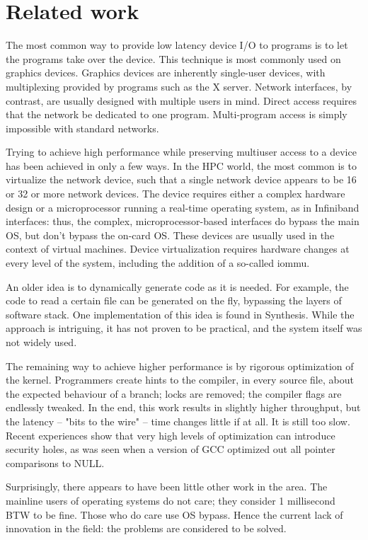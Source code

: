 \documentclass[letterpaper,twocolumn,10pt]{article}
\begin{document}
\section{Related work}
The most common way to provide low latency device I/O 
to programs is to let the programs take over the device. 
This technique is most commonly used on graphics devices. Graphics devices are inherently single-user devices, with multiplexing 
provided by programs such as the X server. Network interfaces, by contrast, are usually designed with multiple users in mind. 
Direct access requires that the network be dedicated to one program. Multi-program access is simply impossible with 
standard networks. 

Trying to achieve high performance while preserving multiuser access to a device 
has been achieved in only a few ways. In the HPC world, 
the most common is to virtualize the network device, such 
that a single network device appears to be 16 or 32 or more network devices. The device 
requires either a complex hardware design or a microprocessor running a real-time operating system, as in 
Infiniband interfaces: thus, the complex, microprocessor-based interfaces do bypass the main OS, 
but don't bypass the on-card OS\cite{Boden95myrinet}. 
These devices are usually 
used in the context of virtual machines. Device virtualization  requires hardware changes at every level of the system, including
the addition of a so-called iommu\cite{iommu}. 

An older idea is to dynamically generate code as it is needed. For example, the code to read a certain file can 
be generated on the fly, bypassing the layers of software stack. One implementation of this idea 
is found in   Synthesis\cite{synthesis}. While the approach is intriguing, 
it has not proven to be practical, and the system itself was not widely used. 

The remaining way to achieve higher performance is by rigorous optimization of the kernel. Programmers
create hints to the compiler, in every source file, about the expected behaviour of a branch; locks are removed; 
the compiler flags are endlessly tweaked. In the end, this work results in slightly higher throughput, but the 
latency -- "bits to the wire" -- time changes little if at all. It is still too slow. Recent experiences show that 
very high levels  
of optimization can introduce security holes, as was seen when a version of GCC 
optimized out all pointer comparisons to 
NULL. 

Surprisingly, there appears to have been little other work in the area. The mainline users of operating systems do not care; they consider 1 millisecond 
BTW to be fine. Those who do care use OS bypass. Hence the current lack of 
innovation in the field: the problems are considered to be solved. 
\end{document}
